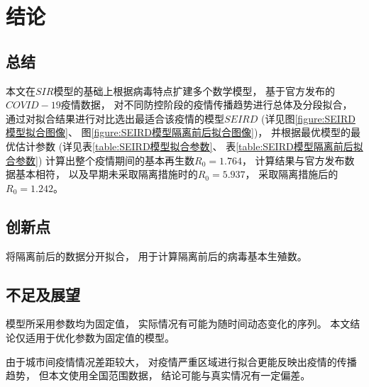 \section{结论}
\subsection{总结}
\par 本文在$SIR$模型的基础上根据病毒特点扩建多个数学模型，
基于官方发布的$COVID-19$疫情数据，
对不同防控阶段的疫情传播趋势进行总体及分段拟合，
通过对拟合结果进行对比选出最适合该疫情的模型$SEIRD$
(详见图\ref{figure:SEIRD模型拟合图像}、
图\ref{figure:SEIRD模型隔离前后拟合图像})，
并根据最优模型的最优估计参数
(详见表\ref{table:SEIRD模型拟合参数}、
表\ref{table:SEIRD模型隔离前后拟合参数})
计算出整个疫情期间的基本再生数$R_0=1.764$，
计算结果与官方发布数据基本相符，
以及早期未采取隔离措施时的$R_0=5.937$，
采取隔离措施后的$R_0=1.242$。
\subsection{创新点}
\par 将隔离前后的数据分开拟合，
用于计算隔离前后的病毒基本生殖数。
\subsection{不足及展望}
\par 模型所采用参数均为固定值，
实际情况有可能为随时间动态变化的序列。
本文结论仅适用于优化参数为固定值的模型。
\par 由于城市间疫情情况差距较大，
对疫情严重区域进行拟合更能反映出疫情的传播趋势，
但本文使用全国范围数据，
结论可能与真实情况有一定偏差。